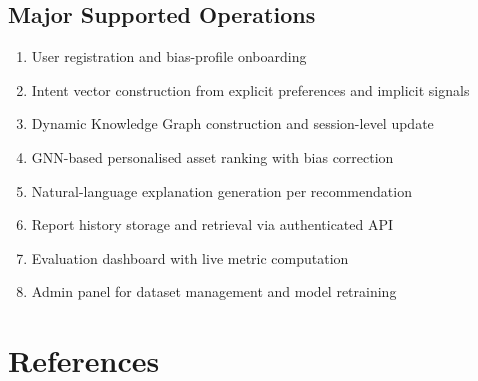 \documentclass[12pt, a4paper]{article}
\begin{document}
\subsection{Major Supported Operations}

\begin{enumerate}[leftmargin=1.5cm]
  \item User registration and bias-profile onboarding
  \item Intent vector construction from explicit preferences and implicit signals
  \item Dynamic Knowledge Graph construction and session-level update
  \item GNN-based personalised asset ranking with bias correction
  \item Natural-language explanation generation per recommendation
  \item Report history storage and retrieval via authenticated API
  \item Evaluation dashboard with live metric computation
  \item Admin panel for dataset management and model retraining
\end{enumerate}

\newpage
{}

\section*{References}
\end{document}
